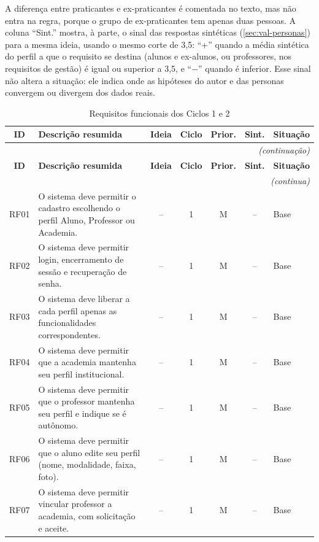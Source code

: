 A diferença entre praticantes e ex-praticantes é comentada no texto, mas
não entra na regra, porque o grupo de ex-praticantes tem apenas duas
pessoas. A coluna ``Sint.'' mostra, à parte, o sinal das respostas
sintéticas (\autoref{sec:val-personas}) para a mesma ideia, usando o
mesmo corte de 3,5: ``+'' quando a média sintética do perfil a que o
requisito se destina (alunos e ex-alunos, ou professores, nos requisitos
de gestão) é igual ou superior a 3,5, e ``$-$'' quando é inferior. Esse
sinal não altera a situação: ele indica onde as hipóteses do autor e das
personas convergem ou divergem dos dados reais.

\begin{quadrolongo}
\begin{longtable}{|c|p{6.6cm}|c|c|c|c|p{1.6cm}|}
  \caption{Requisitos funcionais dos Ciclos 1 e 2}\label{qua:rf}\\
  \hline
  \textbf{ID} & \textbf{Descrição resumida} & \textbf{Ideia} & \textbf{Ciclo} & \textbf{Prior.} & \textbf{Sint.} & \textbf{Situação} \\ \hline
\endfirsthead
  \multicolumn{7}{r}{\textit{(continuação)}}\\
  \hline
  \textbf{ID} & \textbf{Descrição resumida} & \textbf{Ideia} & \textbf{Ciclo} & \textbf{Prior.} & \textbf{Sint.} & \textbf{Situação} \\ \hline
\endhead
  \multicolumn{7}{r}{\textit{(continua)}}\\
\endfoot
\endlastfoot
    RF01 & O sistema deve permitir o cadastro escolhendo o perfil Aluno, Professor ou Academia. & -- & 1 & M & -- & Base \\ \hline
    RF02 & O sistema deve permitir login, encerramento de sessão e recuperação de senha. & -- & 1 & M & -- & Base \\ \hline
    RF03 & O sistema deve liberar a cada perfil apenas as funcionalidades correspondentes. & -- & 1 & M & -- & Base \\ \hline
    RF04 & O sistema deve permitir que a academia mantenha seu perfil institucional. & -- & 1 & M & -- & Base \\ \hline
    RF05 & O sistema deve permitir que o professor mantenha seu perfil e indique se é autônomo. & -- & 1 & M & -- & Base \\ \hline
    RF06 & O sistema deve permitir que o aluno edite seu perfil (nome, modalidade, faixa, foto). & -- & 1 & M & -- & Base \\ \hline
    RF07 & O sistema deve permitir vincular professor a academia, com solicitação e aceite. & -- & 1 & M & -- & Base \\ \hline

\end{longtable}
\end{quadrolongo}
